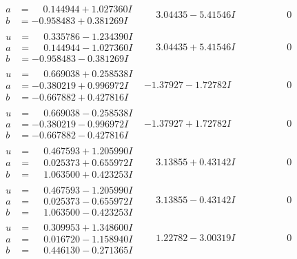 \documentclass[1p]{elsarticle_modified}
\theoremstyle{definition}
\begin{document}
$$\begin{array}{c|c|c}
\begin{aligned}
a &= \phantom{-}0.144944 + 1.027360 I \\
b &= -0.958483 + 0.381269 I\end{aligned}
 & \phantom{-}3.04435 - 5.41546 I & \phantom{-0.000000 } 0 \\ \hline\begin{aligned}
u &= \phantom{-}0.335786 - 1.234390 I \\
a &= \phantom{-}0.144944 - 1.027360 I \\
b &= -0.958483 - 0.381269 I\end{aligned}
 & \phantom{-}3.04435 + 5.41546 I & \phantom{-0.000000 } 0 \\ \hline\begin{aligned}
u &= \phantom{-}0.669038 + 0.258538 I \\
a &= -0.380219 + 0.996972 I \\
b &= -0.667882 + 0.427816 I\end{aligned}
 & -1.37927 - 1.72782 I & \phantom{-0.000000 } 0 \\ \hline\begin{aligned}
u &= \phantom{-}0.669038 - 0.258538 I \\
a &= -0.380219 - 0.996972 I \\
b &= -0.667882 - 0.427816 I\end{aligned}
 & -1.37927 + 1.72782 I & \phantom{-0.000000 } 0 \\ \hline\begin{aligned}
u &= \phantom{-}0.467593 + 1.205990 I \\
a &= \phantom{-}0.025373 + 0.655972 I \\
b &= \phantom{-}1.063500 + 0.423253 I\end{aligned}
 & \phantom{-}3.13855 + 0.43142 I & \phantom{-0.000000 } 0 \\ \hline\begin{aligned}
u &= \phantom{-}0.467593 - 1.205990 I \\
a &= \phantom{-}0.025373 - 0.655972 I \\
b &= \phantom{-}1.063500 - 0.423253 I\end{aligned}
 & \phantom{-}3.13855 - 0.43142 I & \phantom{-0.000000 } 0 \\ \hline\begin{aligned}
u &= \phantom{-}0.309953 + 1.348600 I \\
a &= \phantom{-}0.016720 - 1.158940 I \\
b &= \phantom{-}0.446130 - 0.271365 I\end{aligned}
 & \phantom{-}1.22782 - 3.00319 I & \phantom{-0.000000 } 0 \\ \hline\begin{aligned}

\end{aligned}
\end{array}$$
\end{document}
